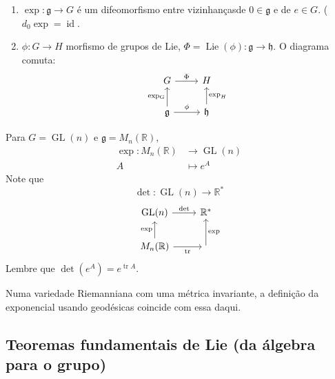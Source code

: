 \begin{enumerate}
	\item $\operatorname{exp}: \mathfrak{g}\to G$ \'e um difeomorfismo entre vizinhançasde $0\in\mathfrak{g}$ e de $e\in G$. ($d_{0}\operatorname{exp}= \operatorname{id}$.

	\item $\phi:G\to H$ morfismo de grupos de Lie, $\Phi=\operatorname{Lie}(\phi) :\mathfrak{g} \to  \mathfrak{h}$. O diagrama comuta:
\[\begin{tikzcd}
	G\arrow[r,"\Phi"]&H\\
	\mathfrak{g}\arrow[u,"\operatorname{exp_G}"]\arrow[r,"\phi"]&\mathfrak{h}\arrow[u,"\operatorname{exp}_H",swap]
\end{tikzcd}\]
\end{enumerate}

\begin{example}
	Para $G=\operatorname{GL}(n)$ e $\mathfrak{g} =M_n(\mathbb{R})$,
	\begin{align*}
		\operatorname{exp}: M_n(\mathbb{R}) &\longrightarrow \operatorname{GL}(n) \\
		A &\longmapsto e^A
	\end{align*}
	Note que
	\[\det :\operatorname{GL}(n)\to \mathbb{R}^*\]
	\[\begin{tikzcd}
		\operatorname{GL}(n)\arrow[r,"\det "]&\mathbb{R}^*\\
		M_n(\mathbb{R})\arrow[u,"\operatorname{exp}"]\arrow[r,swap,"\operatorname{tr}"]&\arrow[u,"\operatorname{exp}",swap]
	\end{tikzcd}\]
	Lembre que $\det(e^A)=e^{\operatorname{tr}A}$.
\end{example}

\begin{remark}
	Numa variedade Riemanniana com uma m\'etrica invariante, a defini\c c\~ao da exponencial usando geod\'esicas coincide com essa daqui.
\end{remark}

\subsection{Teoremas fundamentais de Lie (da \'algebra para o grupo)}

